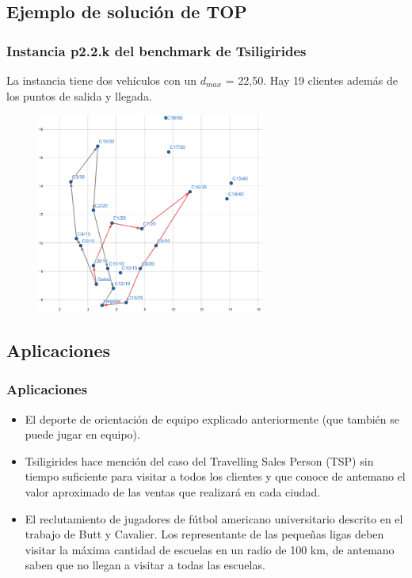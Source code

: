 \documentclass{beamer}
\begin{document}

\subsection{Ejemplo de solución de TOP}

\begin{frame}
\frametitle{Instancia p2.2.k del benchmark de Tsiligirides}

La instancia tiene dos vehículos con un $d_{max}$ = 22,50. Hay 19 clientes además de los puntos de salida y llegada.%

\begin{figure}[h]
	\centering
	\includegraphics[width=7.5cm]{400cropped}
	\label{fig:400cropped}
\end{figure}


\end{frame}


\subsection{Aplicaciones}

\begin{frame}
\frametitle{Aplicaciones}

\begin{itemize}
	\item El deporte de orientación de equipo explicado anteriormente (que también se puede jugar en equipo).
	\pause
	\item Tsiligirides hace mención del caso del Travelling Sales Person (TSP) sin tiempo suficiente para visitar a todos los clientes y que conoce de antemano el valor aproximado de las ventas que realizará en cada ciudad.
	\pause
	\item El reclutamiento de jugadores de fútbol americano universitario descrito en el trabajo de Butt y Cavalier. Los representante de las pequeñas ligas deben visitar la máxima cantidad de escuelas en un radio de 100 km, de antemano saben que no llegan a visitar a todas las escuelas.
\end{itemize}

\end{frame}
\end{document}
